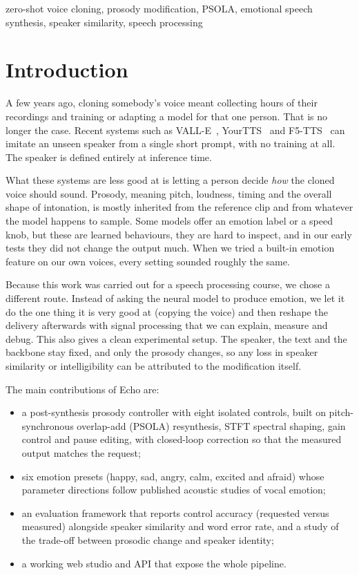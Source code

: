 \documentclass[conference]{IEEEtran}
\begin{document}
\begin{IEEEkeywords}
zero-shot voice cloning, prosody modification, PSOLA, emotional speech synthesis, speaker similarity, speech processing
\end{IEEEkeywords}

\section{Introduction}
A few years ago, cloning somebody's voice meant collecting hours of their recordings and training
or adapting a model for that one person. That is no longer the case. Recent systems such as
VALL-E~\cite{b1}, YourTTS~\cite{b2} and F5-TTS~\cite{b3} can imitate an unseen speaker from a single
short prompt, with no training at all. The speaker is defined entirely at inference time.

What these systems are less good at is letting a person decide \emph{how} the cloned voice should
sound. Prosody, meaning pitch, loudness, timing and the overall shape of intonation, is mostly
inherited from the reference clip and from whatever the model happens to sample. Some models
offer an emotion label or a speed knob, but these are learned behaviours, they are hard to inspect,
and in our early tests they did not change the output much. When we tried a built-in emotion
feature on our own voices, every setting sounded roughly the same.

Because this work was carried out for a speech processing course, we chose a different route.
Instead of asking the neural model to produce emotion, we let it do the one thing it is very good
at (copying the voice) and then reshape the delivery afterwards with signal processing that we
can explain, measure and debug. This also gives a clean experimental setup. The speaker, the text
and the backbone stay fixed, and only the prosody changes, so any loss in speaker similarity or
intelligibility can be attributed to the modification itself.

The main contributions of Echo are:
\begin{itemize}
\item a post-synthesis prosody controller with eight isolated controls, built on pitch-synchronous
overlap-add (PSOLA) resynthesis, STFT spectral shaping, gain control and pause editing, with
closed-loop correction so that the measured output matches the request;
\item six emotion presets (happy, sad, angry, calm, excited and afraid) whose parameter directions
follow published acoustic studies of vocal emotion;
\item an evaluation framework that reports control accuracy (requested versus measured) alongside
speaker similarity and word error rate, and a study of the trade-off between prosodic change and
speaker identity;
\item a working web studio and API that expose the whole pipeline.
\end{itemize}
\end{document}
